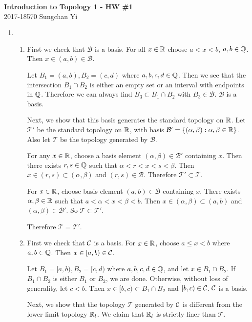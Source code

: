 \documentclass[12pt]{report}
\newcommand{\prob}[1]{\item[\large\textbf{\sffamily #1.}]}
\newcommand{\subprob}[1]{\item[\textbf{\sffamily (#1)}]}
\newcommand{\B}{\mathcal{B}}
\newcommand{\T}{\mathcal{T}}
\begin{document}
\begin{center}
    \textbf{\Large Introduction to Topology 1 - HW \#1}\\
    \large 2017-18570 Sungchan Yi
\end{center}
\begin{enumerate}
    \prob{1}
    \begin{enumerate}
        \subprob{a} First we check that \(\B\) is a basis. For all \(x \in \mathbb{R}\) choose \(a < x < b\), \(a, b \in \mathbb{Q}\). Then \(x \in (a, b) \in \B\).

        Let \(B_1 = (a, b), B_2 = (c, d)\) where \(a, b, c, d\in \mathbb{Q}\). Then we see that the intersection \(B_1 \cap B_2\) is either an empty set or an interval with endpoints in \(\mathbb{Q}\). Therefore we can always find \(B_3 \subset B_1\cap B_2\) with \(B_3 \in \B\). \(\B\) is a basis.

        Next, we show that this basis generates the standard topology on \(\mathbb{R}\). Let \(\T'\) be the standard topology on \(\mathbb{R}\), with basis \(\B' = \{(\alpha, \beta) : \alpha, \beta \in \R\}\). Also let \(\T\) be the topology generated by \(\B\).

        For any \(x \in \mathbb{R}\), choose a basis element \((\alpha, \beta) \in \B'\) containing \(x\). Then there exists \(r, s \in \mathbb{Q}\) such that \(\alpha < r < x < s < \beta\). Then \(x \in (r, s) \subset (\alpha, \beta)\) and \((r, s) \in \B\). Therefore \(\T' \subset \T\).

        For \(x \in \mathbb{R}\), choose basis element \((a, b) \in \B\) containing \(x\). There exists \(\alpha, \beta \in \mathbb{R}\) such that \(a < \alpha < x < \beta < b\). Then \(x \in (\alpha, \beta) \subset (a, b)\) and \((\alpha, \beta) \in \B'\). So \(\T \subset \T'\).

        Therefore \(\T = \T'\).

        \subprob{b} First we check that \(\mathcal{C}\) is a basis. For \(x \in \mathbb{R}\), choose \(a \leq x < b\) where \(a, b \in \mathbb{Q}\). Then \(x \in [a, b) \in \mathcal{C}\).

        Let \(B_1 = [a, b), B_2 = [c, d)\) where \(a, b, c, d \in \mathbb{Q}\), and let \(x \in B_1 \cap B_2\). If \(B_1 \cap B_2\) is either \(B_1\) or \(B_2\), we are done. Otherwise, without loss of generality, let \(c < b\). Then \(x \in [b, c) \subset B_1\cap B_2\) and \([b, c) \in \mathcal{C}\). \(\mathcal{C}\) is a basis.

        Next, we show that the topology \(\T\) generated by \(\mathcal{C}\) is different from the lower limit topology \(\mathbb{R}_l\). We claim that \(\mathbb{R}_l\) is strictly finer than \(\T\).


\end{enumerate}
\end{enumerate}
\end{document}
